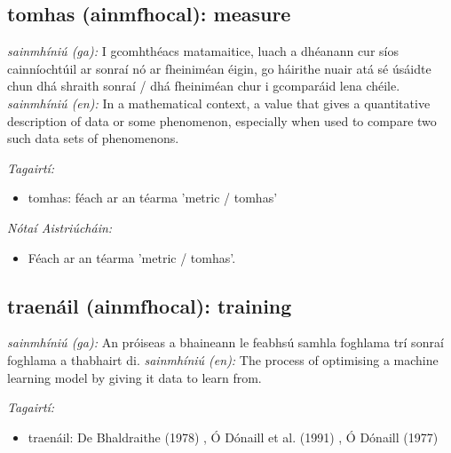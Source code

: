 \documentclass{article}
\begin{document}
\subsection*{tomhas (ainmfhocal): measure} 
 \noindent \textit{sainmhíniú (ga):} I gcomhthéacs matamaitice, luach a dhéanann cur síos cainníochtúil ar sonraí nó ar fheiniméan éigin, go háirithe nuair atá sé úsáidte chun dhá shraith sonraí / dhá fheiniméan chur i gcomparáid lena chéile.
\newline\newline
 \noindent \textit{sainmhíniú (en):} In a mathematical context, a value that gives a quantitative description of data or some phenomenon, especially when used to compare two such data sets of phenomenons.
\newline

 \noindent \textit{Tagairtí:}
\begin{itemize}
	\item tomhas: féach ar an téarma 'metric / tomhas'
\end{itemize}

 \noindent \textit{Nótaí Aistriúcháin:}
\begin{itemize}
	\item Féach ar an téarma 'metric / tomhas'.
\end{itemize}


\subsection*{traenáil (ainmfhocal): training} 
 \noindent \textit{sainmhíniú (ga):} An próiseas a bhaineann le feabhsú samhla foghlama trí sonraí foghlama a thabhairt di.
\newline\newline
 \noindent \textit{sainmhíniú (en):} The process of optimising a machine learning model by giving it data to learn from.
\newline

 \noindent \textit{Tagairtí:}
\begin{itemize}
	\item traenáil: De Bhaldraithe (1978) \cite{de-bhaldraithe}, Ó Dónaill et al. (1991) \cite{focloir-beag}, Ó Dónaill (1977) \cite{odonaill}
\end{itemize}
\end{document}
